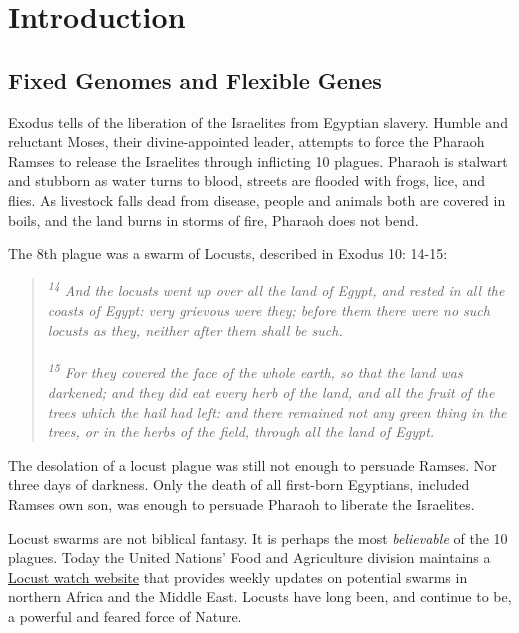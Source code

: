 \chapter{Introduction}  \label{Intro} 
\section{Fixed Genomes and Flexible Genes}
  \label{Intro:sec:Fixed Genomes and Flexible Genes} 

  Exodus tells of the liberation of the Israelites from Egyptian slavery. Humble and reluctant Moses, their divine-appointed leader, attempts to force the Pharaoh Ramses to release the Israelites through inflicting 10 plagues. Pharaoh is stalwart and stubborn as water turns to blood, streets are flooded with frogs, lice, and flies. As livestock falls dead from disease, people and animals both are covered in boils, and the land burns in storms of fire, Pharaoh does not bend.

  The 8th plague was a swarm of Locusts, described in Exodus 10: 14-15:

  \begin{quote}
    \itshape
    \singlespacing
    \textsuperscript{14} And the locusts went up over all the land of Egypt, and rested in all the coasts of Egypt: very grievous were they; before them there were no such locusts as they, neither after them shall be such.\\ 
      \\
    \textsuperscript{15} For they covered the face of the whole earth, so that the land was darkened; and they did eat every herb of the land, and all the fruit of the trees which the hail had left: and there remained not any green thing in the trees, or in the herbs of the field, through all the land of Egypt.
    \end{quote}

  The desolation of a locust plague was still not enough to persuade Ramses. Nor three days of darkness. Only the death of all first-born Egyptians, included Ramses own son, was enough to persuade Pharaoh to liberate the Israelites.

  Locust swarms are not biblical fantasy. It is perhaps the most \textit{believable} of the 10 plagues. Today the United Nations' Food and Agriculture division maintains a \href{http://www.fao.org/ag/locusts/en/info/info/news/index.html}{Locust watch website} that provides weekly updates on potential swarms in northern Africa and the Middle East. Locusts have long been, and continue to be, a powerful and feared force of Nature.

